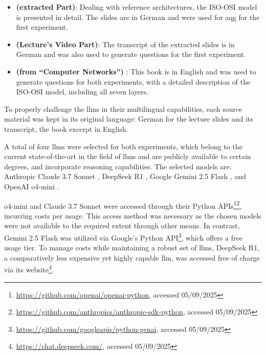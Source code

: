\begin{itemize}
    \item {} \textbf{(extracted Part)}: Dealing with reference architectures, the ISO-OSI model is presented in detail. The slides are in German and were used for \ac{aqg} for the first experiment.
    \item {} \textbf{(Lecture's Video Part)}: The transcript of the extracted slides is in German and was also used to generate questions for the first experiment.
    \item {} \textbf{(from \enquote{Computer Networks})} \cite{tanenbaum_computer_2013}: This book is in English and was used to generate questions for both experiments, with a detailed description of the ISO-OSI model, including all seven layers.
\end{itemize}

To properly challenge the \ac{llms} in their multilingual capabilities, each source material was kept in its original language: German for the lecture slides and its transcript, the book excerpt in English.

\pagebreak

 A total of four \ac{llms} were selected for both experiments, which belong to the current state-of-the-art in the field of \ac{llms} and are publicly available to certain degrees, and incorporate reasoning capabilities. The selected models are:
Anthropic Claude 3.7 Sonnet \cite{anthropic_claude_2025},
    DeepSeek R1 \cite{deepseek-ai_deepseek-r1_2025},
    Google Gemini 2.5 Flash \cite{kavukcuoglu_gemini_2025}, and
    OpenAI o4-mini \cite{openai_openai_2025-1}.

\vspace{1em}

o4-mini and Claude 3.7 Sonnet were accessed through their Python APIs\footnote{\label{fn:openai-api}\url{https://github.com/openai/openai-python}, accessed 05/09/2025}\footnote{\label{fn:anthropic-api}\url{https://github.com/anthropics/anthropic-sdk-python}, accessed 05/09/2025}, incurring costs per usage. This access method was necessary as the chosen models were not available to the required extent through other means. In contrast, Gemini 2.5 Flash was utilized via Google's Python API\footnote{\label{fn:google-api}\url{https://github.com/googleapis/python-genai}, accessed 05/09/2025}, which offers a free usage tier. To manage costs while maintaining a robust set of \ac{llms}, DeepSeek R1, a comparatively less expensive yet highly capable \ac{llm}, was accessed free of charge via its website\footnote{\label{fn:deepseek}\url{https://chat.deepseek.com/}, accessed 05/09/2025}.

